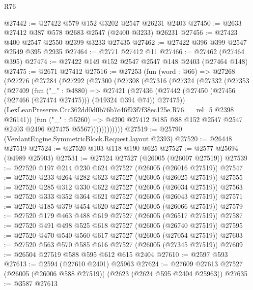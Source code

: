 \begin{lexlean}{R76}
\begin{coremodule}
@27442 := @27422 @579 @152 @3202 @2547 @26231 @2403
@27450 := @2633 @27412 @387 @578 @2683 @2547 (@2400 @3233) @26231
@27456 := @27423 @400 @2547 @2550 @2399 @3233 @27435
@27462 := @27422 @396 @399 @2547 @2549 @395 @2935
@27464 := @2771 @27412 @11
@27466 := @27462 (@27464 @395)
@27474 := @27422 @149 @152 @2547 @2547 @148 @2403 (@27464 @148)
@27475 := @2671 @27412
@27516 := @27253
    (fun (word : @66) =>
    @27268
      (@27276
        (@27284
          (@27292
            (@27300
              (@27308
                (@27316
                  (@27324
                    (@27332
                      (@27353
                        (@27409
                          (fun ("_" : @4880) =>
                          @27421
                            (@27436
                              (@27442
                                (@27450 (@27456 (@27466 (@27474 @27475))) (@19324 @394 @74))
                                @27475))
                            (LexLeanPreserve.Ccc362dd0d0b76b7c46f93f7f38ec125e.R76.__rel_5
                              @2398
                              @26141))
                          (fun ("_" : @5260) =>
                          @4200
                            @27412
                            @185
                            @88
                            @152
                            @2547
                            @2547
                            @2403
                            @2496
                            @27475
                            @5567))))))))))))
@27519 := @25790 (VerdantEngine.SymmetricBlock.Request.layout @2393)
@27520 := @26448 @27519
@27524 := @27520 @103 @118 @190 @625
@27527 := @2577 @25694 (@4989 @25903)
@27531 := @27524 @27527 (@26005 (@26007 @27519))
@27539 := @27520 @197 @214 @230 @624 @27527 (@26005 (@26016 @27519))
@27547 := @27520 @233 @264 @282 @623 @27527 (@26005 (@26025 @27519))
@27555 := @27520 @285 @312 @330 @622 @27527 (@26005 (@26034 @27519))
@27563 := @27520 @333 @352 @364 @621 @27527 (@26005 (@26043 @27519))
@27571 := @27520 @185 @379 @454 @620 @27527 (@26005 (@26066 @27519))
@27579 := @27520 @179 @463 @488 @619 @27527 (@26005 (@26517 @27519))
@27587 := @27520 @491 @498 @525 @618 @27527 (@26005 (@26740 @27519))
@27595 := @27520 @470 @540 @560 @617 @27527 (@26005 (@27054 @27519))
@27603 := @27520 @563 @570 @585 @616 @27527 (@26005 (@27345 @27519))
@27609 := @26504 @27519 @588 @595 @612 @615 @2404
@27610 := @2597 @593
@27613 := @2594 (@27610 @2401) @25963
@27624 := @27609 @27613 @27527 (@26005 (@26006 @588 @27519)) (@2623 (@2624 @595 @2404 @25963))
@27635 := @3587
    @27613

\end{coremodule}
\end{lexlean}
